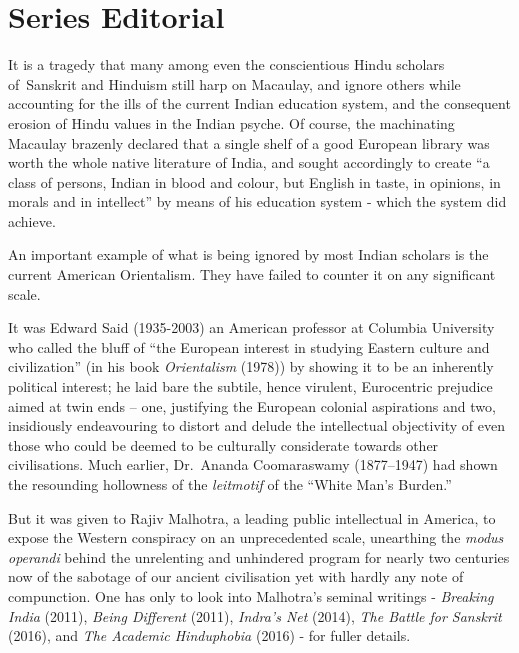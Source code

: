 \chapter*{Series Editorial}\label{series_editorial}



It is a tragedy that many among even the conscientious Hindu scholars of~Sanskrit and Hinduism still harp on Macaulay, and ignore others while accounting for the ills of the current Indian education system, and the consequent erosion of Hindu values in the Indian psyche. Of course, the machinating Macaulay brazenly declared that a single shelf of a good European library was worth the whole native literature of India, and sought accordingly to create “a class of persons, Indian in blood and colour, but English in taste, in opinions, in morals and in intellect” by means of his education system - which the system did achieve. 

An important example of what is being ignored by most Indian scholars is the current American Orientalism. They have failed to counter it on any significant scale. 

It was Edward Said (1935-2003) an American professor at Columbia University who called the bluff of “the European interest in studying Eastern culture and civilization” (in his book {\sl Orientalism} (1978)) by showing it to be an inherently political interest; he laid bare the subtile, hence virulent, Eurocentric prejudice aimed at twin ends – one, justifying the European colonial aspirations and two, insidiously endeavouring to distort  and delude the intellectual objectivity of even those who could be deemed to be culturally considerate towards other civilisations. Much earlier, Dr.\ Ananda Coomaraswamy (1877--1947) had shown the resounding hollowness of the {\sl leitmotif} of the “White Man’s Burden.” 

But it was given to Rajiv Malhotra, a leading public intellectual in America, to expose the Western conspiracy on an unprecedented scale, unearthing the {\sl modus operandi} behind the unrelenting and unhindered program for nearly two centuries now of the sabotage of our ancient civilisation yet with hardly any note of compunction.  One has only to look into Malhotra’s seminal writings - {\sl Breaking India} (2011), {\sl Being Different} (2011), {\sl Indra’s Net} (2014), {\sl The Battle for Sanskrit} (2016), and {\sl The Academic Hinduphobia} (2016) - for fuller details.
\vskip 1.5pt

